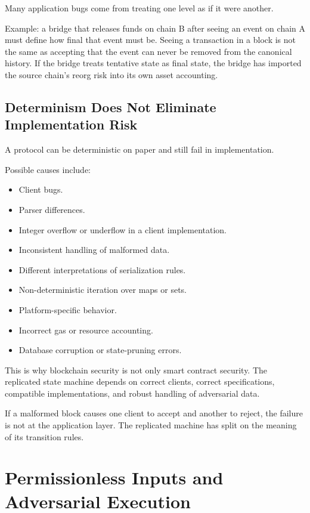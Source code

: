 Many application bugs come from treating one level as if it were
another.

Example: a bridge that releases funds on chain B after seeing an event
on chain A must define how final that event must be. Seeing a
transaction in a block is not the same as accepting that the event can
never be removed from the canonical history. If the bridge treats
tentative state as final state, the bridge has imported the source
chain's reorg risk into its own asset accounting.

\subsection{Determinism Does Not Eliminate Implementation Risk}

A protocol can be deterministic on paper and still fail in
implementation.

Possible causes include:

\begin{itemize}
\tightlist
\item
  Client bugs.
\item
  Parser differences.
\item
  Integer overflow or underflow in a client implementation.
\item
  Inconsistent handling of malformed data.
\item
  Different interpretations of serialization rules.
\item
  Non-deterministic iteration over maps or sets.
\item
  Platform-specific behavior.
\item
  Incorrect gas or resource accounting.
\item
  Database corruption or state-pruning errors.
\end{itemize}

This is why blockchain security is not only smart contract security. The
replicated state machine depends on correct clients, correct
specifications, compatible implementations, and robust handling of
adversarial data.

If a malformed block causes one client to accept and another to reject,
the failure is not at the application layer. The replicated machine has
split on the meaning of its transition rules.

\section{Permissionless Inputs and Adversarial Execution}

